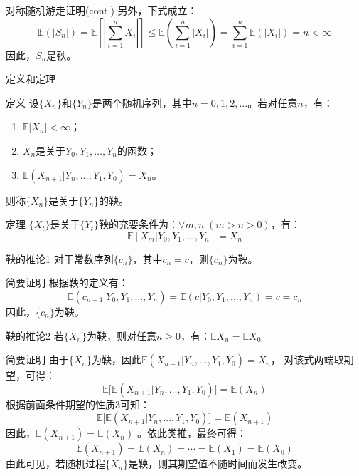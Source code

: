 \documentclass[t]{beamer}
\newcommand{\E}{\mathbb{E}}
\begin{document}
\begin{frame}{对称随机游走证明(cont.)}
    另外，下式成立：
    \begin{equation*}
    \E(|S_n|)=\E\left[\left|\sum^n_{i=1}X_i\right|\right]\le \E\left(\sum^n_{i=1}|X_i|\right)=\sum^n_{i=1}\E(|X_i|)=n<\infty
    \end{equation*}
    因此，$S_n$是鞅。
\end{frame}

     \begin{frame}{定义和定理}
      \begin{block}{定义}
        设$\{X_n\}$和$\{Y_n\}$是两个随机序列，其中$n=0,1,2,\ldots$。若对任意$n$，有：
        \begin{enumerate}
          \item $\E|X_n|<\infty$；
          \item $X_n$是关于$Y_0,Y_1,\ldots,Y_n$的函数；
          \item $\E(X_{n+1}|Y_n,\ldots, Y_1, Y_0)=X_n$。
        \end{enumerate}
        则称$\{X_n\}$是关于$\{Y_n\}$的鞅。
      \end{block}
      
      \begin{block}{定理}
      $\{X_t\}$是关于$\{Y_t\}$鞅的充要条件为：$\forall m,n\; (m>n>0)$，有：
      \begin{equation*}
      \E[X_m|Y_0,Y_1,\ldots, Y_n]=X_n 
      \end{equation*}
      \end{block}
     \end{frame}

      
      \begin{frame}{鞅的推论1}
对于常数序列$\{c_n\}$，其中$c_n=c$，则$\{c_n\}$为鞅。

\begin{block}{简要证明}
  根据鞅的定义有：
\[\E(c_{n+1}|Y_0,Y_1,\ldots,Y_n)= \E(c|Y_0,Y_1,\ldots,Y_n)=c=c_n\]
因此，$\{c_n\}$为鞅。
\end{block}
\end{frame}

      
\begin{frame}{鞅的推论2}
若$\{X_n\}$为鞅，则对任意$n\ge 0$，有：$\E X_n=\E X_0$	

\small
\begin{block}{简要证明}
  由于$\{X_n\}$为鞅，因此$\E(X_{n+1}|Y_n,\ldots, Y_1, Y_0)=X_n$，
对该式两端取期望，可得：
\[\E\big[\E(X_{n+1}|Y_n,\ldots, Y_1, Y_0)\big]=\E(X_n) \]
根据前面条件期望的性质3可知：
\[\E\big[\E(X_{n+1}|Y_n,\ldots, Y_1, Y_0)\big]=\E(X_{n+1})\]
因此，$\E(X_{n+1})=\E(X_{n})$
。依此类推，最终可得：
\begin{equation*}
\E(X_{n+1})=\E(X_{n})=\cdots =\E(X_{1})=\E(X_{0})
\end{equation*}
由此可见，若随机过程$\{X_n\}$是鞅，则其期望值不随时间而发生改变。
\end{block}
\end{frame}
\end{document}
